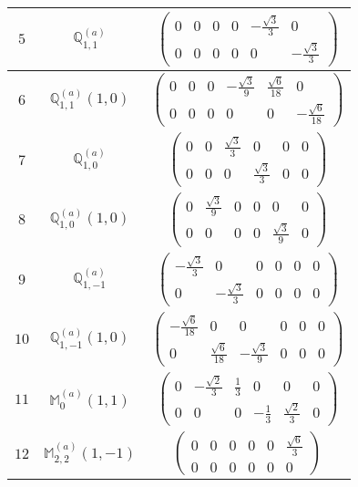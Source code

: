 \documentclass[fleqn,8pt,landscape]{jsarticle}
\begin{document}
\begin{center}
\begin{longtable}{ccc}
$ 5 $ & $ \mathbb{Q}_{1,1}^{(a)} $ & $ \begin{pmatrix} 0 & 0 & 0 & 0 & - \frac{\sqrt{3}}{3} & 0 \\ 0 & 0 & 0 & 0 & 0 & - \frac{\sqrt{3}}{3} \end{pmatrix} $ \\ \hline
$ 6 $ & $ \mathbb{Q}_{1,1}^{(a)}(1,0) $ & $ \begin{pmatrix} 0 & 0 & 0 & - \frac{\sqrt{3}}{9} & \frac{\sqrt{6}}{18} & 0 \\ 0 & 0 & 0 & 0 & 0 & - \frac{\sqrt{6}}{18} \end{pmatrix} $ \\ \hline
$ 7 $ & $ \mathbb{Q}_{1,0}^{(a)} $ & $ \begin{pmatrix} 0 & 0 & \frac{\sqrt{3}}{3} & 0 & 0 & 0 \\ 0 & 0 & 0 & \frac{\sqrt{3}}{3} & 0 & 0 \end{pmatrix} $ \\ \hline
$ 8 $ & $ \mathbb{Q}_{1,0}^{(a)}(1,0) $ & $ \begin{pmatrix} 0 & \frac{\sqrt{3}}{9} & 0 & 0 & 0 & 0 \\ 0 & 0 & 0 & 0 & \frac{\sqrt{3}}{9} & 0 \end{pmatrix} $ \\ \hline
$ 9 $ & $ \mathbb{Q}_{1,-1}^{(a)} $ & $ \begin{pmatrix} - \frac{\sqrt{3}}{3} & 0 & 0 & 0 & 0 & 0 \\ 0 & - \frac{\sqrt{3}}{3} & 0 & 0 & 0 & 0 \end{pmatrix} $ \\ \hline
$ 10 $ & $ \mathbb{Q}_{1,-1}^{(a)}(1,0) $ & $ \begin{pmatrix} - \frac{\sqrt{6}}{18} & 0 & 0 & 0 & 0 & 0 \\ 0 & \frac{\sqrt{6}}{18} & - \frac{\sqrt{3}}{9} & 0 & 0 & 0 \end{pmatrix} $ \\ \hline
$ 11 $ & $ \mathbb{M}_{0}^{(a)}(1,1) $ & $ \begin{pmatrix} 0 & - \frac{\sqrt{2}}{3} & \frac{1}{3} & 0 & 0 & 0 \\ 0 & 0 & 0 & - \frac{1}{3} & \frac{\sqrt{2}}{3} & 0 \end{pmatrix} $ \\ \hline
$ 12 $ & $ \mathbb{M}_{2,2}^{(a)}(1,-1) $ & $ \begin{pmatrix} 0 & 0 & 0 & 0 & 0 & \frac{\sqrt{6}}{3} \\ 0 & 0 & 0 & 0 & 0 & 0 \end{pmatrix} $ \\ \hline

\end{longtable}
\end{center}
\end{document}
